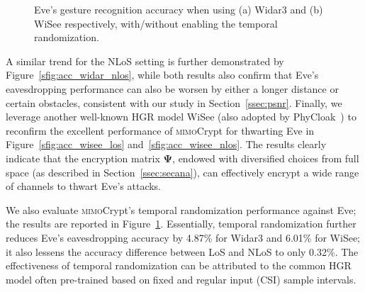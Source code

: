 \documentclass[conference,compsoc]{IEEEtran}
\newcommand{\sname}{\textsc{mimo}Crypt\xspace}
\newcommand{\newrev}[1]{{\color{blue}#1}}    %
\newcommand{\newrev}[1]{#1}
\begin{document}
%
\begin{figure}[b]
	\setlength\abovecaptionskip{8pt}
	\vspace{-2ex}
	\centering
	\caption{Eve's gesture recognition accuracy when using (a) Widar3 and (b) WiSee respectively, with/without enabling the temporal randomization.}
	\label{fig:temporalper}
	\vspace{-.5ex}
\end{figure}
%
A similar trend for the NLoS setting is further demonstrated by Figure~\ref{sfig:acc_widar_nlos}, while both results also confirm that Eve's eavesdropping performance can also be worsen by either a longer distance or certain obstacles, consistent with our study in Section~\ref{ssec:psnr}. Finally, we leverage another well-known HGR model WiSee (also adopted by PhyCloak~\cite{PhyCloak-NSDI16}) to reconfirm the excellent performance of \sname for thwarting Eve in Figure~\ref{sfig:acc_wisee_los} and~\ref{sfig:acc_wisee_nlos}. \newrev{The results clearly indicate that the encryption matrix $\bm{\Psi}$, endowed with diversified choices from full space (as described in Section~\ref{ssec:secana}), can effectively encrypt a wide range of channels to thwart Eve's attacks. }
 
 
We also evaluate \sname's temporal randomization performance against Eve; the results are reported in Figure~\ref{fig:temporalper}. Essentially, temporal randomization further reduces Eve’s eavesdropping accuracy by 4.87\% for Widar3 and 6.01\% for WiSee; it also lessens the accuracy difference between LoS and NLoS to only 0.32\%. The effectiveness of temporal randomization can be attributed to the common HGR model often pre-trained based on fixed and regular input (CSI) sample intervals. 

\end{document}
